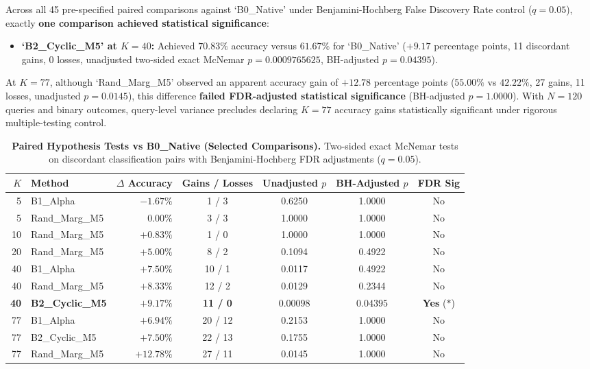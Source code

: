 \documentclass[11pt,a4paper]{article}
\begin{document}
Across all 45 pre-specified paired comparisons against `B0\_Native' under Benjamini-Hochberg False Discovery Rate control ($q=0.05$), exactly \textbf{one comparison achieved statistical significance}:
\begin{itemize}
    \item \textbf{`B2\_Cyclic\_M5' at $K=40$:} Achieved $70.83\%$ accuracy versus $61.67\%$ for `B0\_Native' ($+9.17$ percentage points, 11 discordant gains, 0 losses, unadjusted two-sided exact McNemar $p = 0.0009765625$, BH-adjusted $p = 0.04395$).
\end{itemize}

At $K=77$, although `Rand\_Marg\_M5' observed an apparent accuracy gain of $+12.78$ percentage points ($55.00\%$ vs $42.22\%$, 27 gains, 11 losses, unadjusted $p=0.0145$), this difference \textbf{failed FDR-adjusted statistical significance} (BH-adjusted $p=1.0000$). With $N=120$ queries and binary outcomes, query-level variance precludes declaring $K=77$ accuracy gains statistically significant under rigorous multiple-testing control.

\begin{table}[H]
\centering
\small
\caption{\textbf{Paired Hypothesis Tests vs B0\_Native (Selected Comparisons).} Two-sided exact McNemar tests on discordant classification pairs with Benjamini-Hochberg FDR adjustments ($q=0.05$).}
\label{tab:significance_summary}
\begin{tabular}{r l r c c c c}
\toprule
$K$ & Method & $\Delta$ Accuracy & Gains / Losses & Unadjusted $p$ & BH-Adjusted $p$ & FDR Sig \\
\midrule
5  & B1\_Alpha     & $-1.67\%$ & 1 / 3  & 0.6250   & 1.0000 & No \\
5  & Rand\_Marg\_M5 & $0.00\%$  & 3 / 3  & 1.0000   & 1.0000 & No \\
10 & Rand\_Marg\_M5 & $+0.83\%$ & 1 / 0  & 1.0000   & 1.0000 & No \\
20 & Rand\_Marg\_M5 & $+5.00\%$ & 8 / 2  & 0.1094   & 0.4922 & No \\
40 & B1\_Alpha     & $+7.50\%$ & 10 / 1 & 0.0117   & 0.4922 & No \\
40 & Rand\_Marg\_M5 & $+8.33\%$ & 12 / 2 & 0.0129   & 0.2344 & No \\
\textbf{40} & \textbf{B2\_Cyclic\_M5} & $\mathbf{+9.17\%}$ & \textbf{11 / 0} & $\mathbf{0.00098}$ & $\mathbf{0.04395}$ & \textbf{Yes} ($*$) \\
77 & B1\_Alpha     & $+6.94\%$ & 20 / 12 & 0.2153   & 1.0000 & No \\
77 & B2\_Cyclic\_M5 & $+7.50\%$ & 22 / 13 & 0.1755   & 1.0000 & No \\
77 & Rand\_Marg\_M5 & $+12.78\%$ & 27 / 11 & 0.0145   & 1.0000 & No \\
\bottomrule
\end{tabular}
\end{table}
\end{document}
